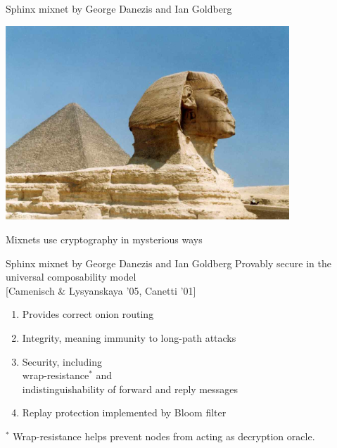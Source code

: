 \documentclass[fleqn,xcolor={usenames,dvipsnames}]{beamer}
\begin{document}
\begin{frame}{Sphinx mixnet by George Danezis and Ian Goldberg}
\begin{center}
\includegraphics[width=0.8\textwidth]{../pics/Sphinx}

Mixnets use cryptography in mysterious ways
\end{center}
\end{frame}


\begin{frame}{Sphinx mixnet by George Danezis and Ian Goldberg}
Provably secure in the universal composability model \\
\hspace*{2pt} [Camenisch \& Lysyanskaya '05, Canetti '01]
\begin{enumerate}
\item Provides correct onion routing
\item Integrity, meaning immunity to long-path attacks
\item Security, including \\
\hspace*{2pt} wrap-resistance{\small $^*$} and \\
\hspace*{2pt} indistinguishability of forward and reply messages
\item[] Replay protection implemented by Bloom filter
\end{enumerate}

\bigskip
\bigskip
\bigskip

{\small $^*$ Wrap-resistance helps prevent nodes from acting as decryption oracle.}
\end{frame}
\end{document}
